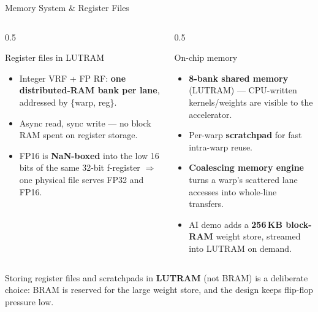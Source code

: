 \documentclass[aspectratio=169,11pt]{beamer}
\newcommand{\hl}[1]{{\color{simtixaccent}\textbf{#1}}}
\newcommand{\navy}[1]{{\color{simtixblue}\textbf{#1}}}
\begin{document}
\begin{frame}{Memory System \& Register Files}
  \begin{columns}[T]
    \begin{column}{0.5\textwidth}
      \begin{block}{Register files in LUTRAM}
        \small
        \begin{itemize}
          \item Integer VRF + FP RF: \hl{one distributed-RAM bank per lane}, addressed by
            \{warp, reg\}.
          \item Async read, sync write --- no block RAM spent on register storage.
          \item FP16 is \navy{NaN-boxed} into the low 16 bits of the same 32-bit f-register
            $\Rightarrow$ one physical file serves FP32 and FP16.
        \end{itemize}
      \end{block}
    \end{column}
    \begin{column}{0.5\textwidth}
      \begin{block}{On-chip memory}
        \small
        \begin{itemize}
          \item \hl{8-bank shared memory} (LUTRAM) --- CPU-written kernels/weights are visible
            to the accelerator.
          \item Per-warp \hl{scratchpad} for fast intra-warp reuse.
          \item \navy{Coalescing memory engine} turns a warp's scattered lane accesses into
            whole-line transfers.
          \item AI demo adds a \hl{256\,KB block-RAM} weight store, streamed into LUTRAM on demand.
        \end{itemize}
      \end{block}
    \end{column}
  \end{columns}
  \vspace{0.3em}
  {\footnotesize Storing register files and scratchpads in \hl{LUTRAM} (not BRAM) is a deliberate
  choice: BRAM is reserved for the large weight store, and the design keeps flip-flop pressure low.}
\end{frame}
\end{document}
